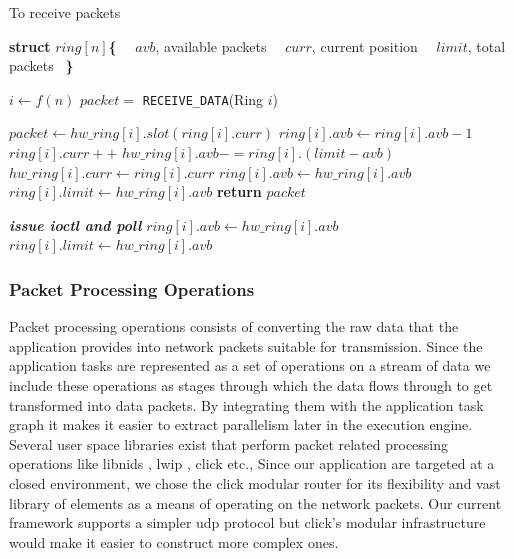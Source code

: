 \documentclass[conference]{IEEEtran}
\begin{document}
\begin{algorithm}[h]
\caption{To receive packets}
\label{r_pack}
\begin{algorithmic}[1]

\State \textbf{struct} $ring[ n ]$\textbf{\{}
\State {}
\State {}
\State \  \  $avb$, available packets
\State \  \  $curr$, current position
\State \  \  $limit$, total packets \ \textbf{\}}

	\State $i \gets f( n ) $ \label{r_pack_param}
	\State $packet =$ \texttt{RECEIVE\_DATA}(Ring $i$)
\EndWhile
\EndFunction

	\State $packet \gets hw\_ring[ i ].slot( ring[ i ].curr ) $
	\State $ring[ i ].avb \gets ring[ i ].avb - 1$
	\State $ring[ i ].curr++$
	 \label{r_pack_thres}
		\State $hw\_ring[ i ].avb -= ring[ i ].( limit - avb)$
		\State $hw\_ring[ i ].curr \gets ring[ i ].curr$
		\State $ring[ i ].avb \gets hw\_ring[ i ].avb$
		\State $ring[ i ].limit \gets hw\_ring[ i ].avb$
	\EndIf
	\State \textbf{return} $packet$
\EndIf

\State \textbf{\textit{issue ioctl and poll}}
\State $ring[ i ].avb \gets hw\_ring[ i ].avb$
\State $ring[ i ].limit \gets hw\_ring[ i ].avb$
\EndFunction

\end{algorithmic}
\end{algorithm}



\subsubsection{Packet Processing Operations}

Packet processing operations consists of converting the raw data that the application provides into network packets suitable for transmission. Since the application tasks are represented as a set of operations on a stream of data we include these operations as stages through which the data flows through to get transformed into data packets. By integrating them with the application task graph it makes it easier to extract parallelism later in the execution engine. Several user space libraries exist that perform packet related processing operations like libnids \cite{libnids}, lwip \cite{Dunkels01designand}, click \cite{Kohler2000} etc., Since our application are targeted at a closed environment, we chose the click modular router for its flexibility and vast library of elements as a means of operating on the network packets. Our current framework supports a simpler udp protocol but click's modular infrastructure would make it easier to construct more complex ones.
\end{document}
